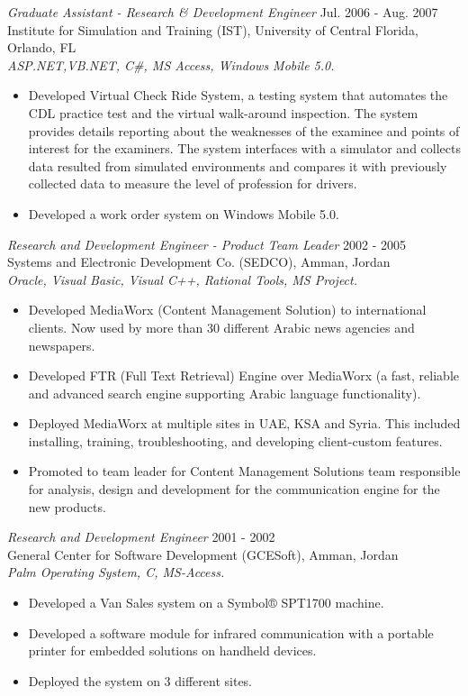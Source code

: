 \documentclass[line,margin]{res}
\begin{document}
\begin{resume}
{\sl Graduate Assistant - Research \& Development Engineer} \hfill    Jul. 2006
- Aug. 2007 \\
Institute for Simulation and Training (IST), University of Central Florida,
Orlando, FL \\
\textit{ASP.NET,VB.NET, C\#, MS Access, Windows Mobile 5.0.}
\begin{itemize} \itemsep -2pt
     \item Developed Virtual Check Ride System, a testing system that automates
     the CDL practice test and the virtual walk-around inspection. The system
     provides details reporting about the weaknesses of the examinee and points
     of interest for the examiners. The system interfaces with a simulator and
     collects data resulted from simulated environments and compares it with
     previously collected data to measure the level of profession for drivers.
     \item Developed a work order system on Windows Mobile 5.0.
\end{itemize}

{\sl Research and Development Engineer - Product Team Leader} \hfill   2002 -
2005 \\
Systems and Electronic Development Co. (SEDCO), Amman, Jordan \\
\textit{Oracle, Visual Basic, Visual C++, Rational Tools, MS Project.}
\begin{itemize} \itemsep -2pt
     \item Developed MediaWorx (Content Management Solution) to international
     clients. Now used by more than 30 different Arabic news agencies and
     newspapers.
     \item Developed FTR (Full Text Retrieval) Engine over MediaWorx (a fast,
     reliable and advanced search engine supporting Arabic language
     functionality).
     \item Deployed MediaWorx at multiple sites in UAE, KSA and Syria. This
     included installing, training, troubleshooting, and developing
     client-custom features.
     \item Promoted to team leader for Content Management Solutions team
     responsible for analysis, design and development for the communication
     engine for the new products.
\end{itemize}

{\sl Research and Development Engineer} \hfill   2001 - 2002 \\
General Center for Software Development (GCESoft), Amman, Jordan \\
\textit{Palm Operating System, C, MS-Access.}
\begin{itemize} \itemsep -2pt
     \item Developed a Van Sales system on a Symbol® SPT1700 machine.
     \item Developed a software module for infrared communication with a
     portable printer for embedded solutions on handheld devices.
     \item Deployed the system on 3 different sites.
\end{itemize}


\end{resume}
\end{document}
